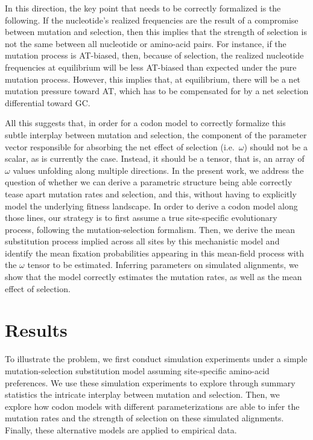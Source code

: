 \documentclass{article}
\begin{document}
In this direction, the key point that needs to be correctly formalized is the following.
If the nucleotide's realized frequencies are the result of a compromise between mutation and selection, then this implies that the strength of selection is not the same between all nucleotide or amino-acid pairs.
For instance, if the mutation process is AT-biased, then, because of selection, the realized nucleotide frequencies at equilibrium will be less AT-biased than expected under the pure mutation process.
However, this implies that, at equilibrium, there will be a net mutation pressure toward AT, which has to be compensated for by a net selection differential toward GC.

All this suggests that, in order for a codon model to correctly formalize this subtle interplay between mutation and selection, the component of the parameter vector responsible for absorbing the net effect of selection (i.e.~$\omega$) should not be a scalar, as is currently the case.
Instead, it should be a tensor, that is, an array of $\omega$ values unfolding along multiple directions.
In the present work, we address the question of whether we can derive a parametric structure being able correctly tease apart mutation rates and selection, and this, without having to explicitly model the underlying fitness landscape.
In order to derive a codon model along those lines, our strategy is to first assume a true site-specific evolutionary process, following the mutation-selection formalism.
Then, we derive the mean {substitution} process implied across all sites by this mechanistic model and identify the mean fixation probabilities appearing in this mean-field process with the $\omega$ tensor to be estimated.
Inferring parameters on simulated alignments, we show that the model correctly estimates the mutation rates, as well as the mean effect of selection.

\section{Results}
\label{sec:results}

To illustrate the problem, we first conduct simulation experiments under a simple mutation-selection {substitution} model assuming site-specific amino-acid preferences.
We use these simulation experiments to explore through summary statistics the intricate interplay between mutation and selection.
Then, we explore how codon models with different parameterizations are able to infer the mutation rates and the strength of selection on these simulated alignments.
Finally, these alternative models are applied to empirical data.
\end{document}
